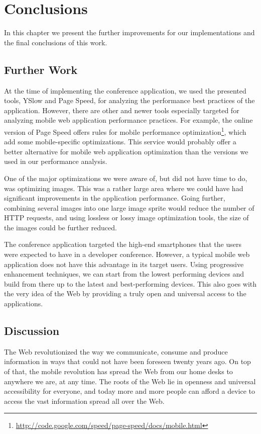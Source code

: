 \chapter{Conclusions}
\label{chapter:conclusions}

In this chapter we present the further improvements for our
implementations and the final conclusions of this work.

\section{Further Work}

At the time of implementing the conference application, we used the
presented tools, YSlow and Page Speed, for analyzing the performance
best practices of the application. However, there are other and newer
tools especially targeted for analyzing mobile web application
performance practices. For example, the online version of Page Speed
offers rules for mobile performance
optimization\footnote{\url{http://code.google.com/speed/page-speed/docs/mobile.html}},
which add some mobile-specific optimizations. This service would
probably offer a better alternative for mobile web application
optimization than the versions we used in our performance analysis.

One of the major optimizations we were aware of, but did not have time
to do, was optimizing images. This was a rather large area where we
could have had significant improvements in the application
performance. Going further, combining several images into one large
image sprite would reduce the number of HTTP requests, and using
lossless or lossy image optimization tools, the size of the images
could be further reduced.

The conference application targeted the high-end smartphones that the
users were expected to have in a developer conference. However, a
typical mobile web application does not have this advantage in its
target users. Using progressive enhancement techniques, we can start
from the lowest performing devices and build from there up to the
latest and best-performing devices. This also goes with the very idea
of the Web by providing a truly open and universal access to the
applications.

\section{Discussion}

The Web revolutionized the way we communicate, consume and produce
information in ways that could not have been foreseen twenty years
ago. On top of that, the mobile revolution has spread the Web from our
home desks to anywhere we are, at any time. The roots of the Web lie
in openness and universal accessibility for everyone, and today more
and more people can afford a device to access the vast information
spread all over the Web.

